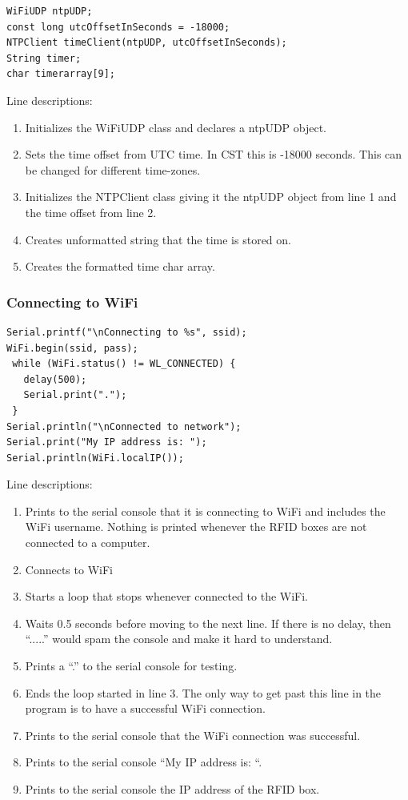 \documentclass[12pt]{article}
\begin{document}
\begin{spacing}{1.2}
\begin{lstlisting}[language=Arduino]  
WiFiUDP ntpUDP;
const long utcOffsetInSeconds = -18000;
NTPClient timeClient(ntpUDP, utcOffsetInSeconds);
String timer;
char timerarray[9];
\end{lstlisting}

Line descriptions:
\begin{enumerate}
	\item Initializes the WiFiUDP class and declares a ntpUDP object.
	\item Sets the time offset from UTC time. In CST this is -18000 seconds. This can be changed for different time-zones.
	\item Initializes the NTPClient class giving it the ntpUDP object from line 1 and the time offset from line 2.
	\item Creates unformatted string that the time is stored on.
	\item Creates the formatted time char array.
\end{enumerate}

\subsubsection{Connecting to WiFi}

\begin{lstlisting}[language=Arduino]  
Serial.printf("\nConnecting to %s", ssid);
WiFi.begin(ssid, pass);
 while (WiFi.status() != WL_CONNECTED) {
   delay(500);
   Serial.print(".");
 }
Serial.println("\nConnected to network");
Serial.print("My IP address is: ");
Serial.println(WiFi.localIP());
\end{lstlisting}

Line descriptions:
\begin{enumerate}
	\item Prints to the serial console that it is connecting to WiFi and includes the WiFi username. Nothing is printed whenever the RFID boxes are not connected to a computer.
	\item Connects to WiFi
	\item Starts a loop that stops whenever connected to the WiFi.
	\item Waits 0.5 seconds before moving to the next line. If there is no delay, then ``.....'' would spam the console and make it hard to understand. 
	\item Prints a ``.'' to the serial console for testing.
	\item Ends the loop started in line 3. The only way to get past this line in the program is to have a successful WiFi connection.
	\item Prints to the serial console that the WiFi connection was successful.
	\item Prints to the serial console ``My IP address is: ``.
	\item Prints to the serial console the IP address of the RFID box.
\end{enumerate}


\end{spacing}
\end{document}
